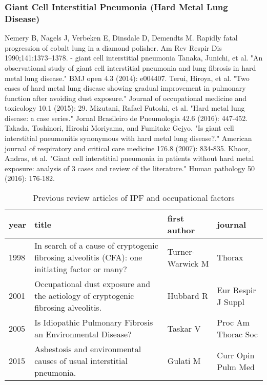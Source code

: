 \documentclass[a4paper,12pt]{article}
\begin{document}
\subsubsection{Giant Cell Interstitial Pneumonia (Hard Metal Lung Disease)}
Nemery B, Nagels J, Verbeken E, Dinsdale D, Demendts M. Rapidly
fatal progression of cobalt lung in a diamond polisher. Am Rev Respir
Dis 1990;141:1373–1378. - giant cell interstitial pneumonia
Tanaka, Junichi, et al. "An observational study of giant cell interstitial pneumonia and lung fibrosis in hard metal lung disease." BMJ open 4.3 (2014): e004407.
Terui, Hiroya, et al. "Two cases of hard metal lung disease showing gradual improvement in pulmonary function after avoiding dust exposure." Journal of occupational medicine and toxicology 10.1 (2015): 29.
Mizutani, Rafael Futoshi, et al. "Hard metal lung disease: a case series." Jornal Brasileiro de Pneumologia 42.6 (2016): 447-452.
Takada, Toshinori, Hiroshi Moriyama, and Fumitake Gejyo. "Is giant cell interstitial pneumonitis synonymous with hard metal lung disease?." American journal of respiratory and critical care medicine 176.8 (2007): 834-835.
Khoor, Andras, et al. "Giant cell interstitial pneumonia in patients without hard metal exposure: analysis of 3 cases and review of the literature." Human pathology 50 (2016): 176-182.




%

\begin{table}
    \begin{tabular}{lp{6cm}ll}
    \textbf{year} & \textbf{title} &       \textbf{first author} &            \textbf{journal} \\
    \midrule
    1998    &  In search of a cause of cryptogenic fibrosing alveolitis (CFA): one initiating factor or many?       &  Turner-Warwick M &              Thorax \\
    2001    &               Occupational dust exposure and the aetiology of cryptogenic fibrosing alveolitis. &         Hubbard R &  Eur Respir J Suppl \\
    2005    &  Is Idiopathic Pulmonary Fibrosis an Environmental Disease?
            &          Taskar V &  Proc Am Thorac Soc \\
    2015    &                            Asbestosis and environmental causes of usual interstitial pneumonia.  &          Gulati M &  Curr Opin Pulm Med \\
    \bottomrule
    \end{tabular}
    \caption{Previous review articles of IPF and occupational factors}
    \label{table:reviews}
\end{table}
\end{document}
